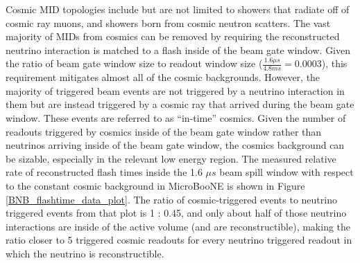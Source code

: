 Cosmic MID topologies include but are not limited to showers that radiate off of cosmic ray muons, and showers born from cosmic neutron scatters. The vast majority of MIDs from cosmics can be removed by requiring the reconstructed neutrino interaction is matched to a flash inside of the beam gate window. Given the ratio of beam gate window size to readout window size ($\frac{1.6\mu s}{4.8ms}=0.0003$), this requirement mitigates almost all of the cosmic backgrounds. However, the majority of triggered beam events are not triggered by a neutrino interaction in them but are instead triggered by a cosmic ray that arrived during the beam gate window. These events are referred to as ``in-time'' cosmics. Given the number of readouts triggered by cosmics inside of the beam gate window rather than neutrinos arriving inside of the beam gate window, the cosmics background can be sizable, especially in the relevant low energy region. The measured relative rate of reconstructed flash times inside the 1.6 $\mu s$ beam spill window with respect to the constant cosmic background in MicroBooNE is shown in Figure \ref{BNB_flashtime_data_plot}. The ratio of cosmic-triggered events to neutrino triggered events from that plot is 1 : 0.45, and only about half of those neutrino interactions are inside of the active volume (and are reconstructible), making the ratio closer to 5 triggered cosmic readouts for every neutrino triggered readout in which the neutrino is reconstructible.\\%


